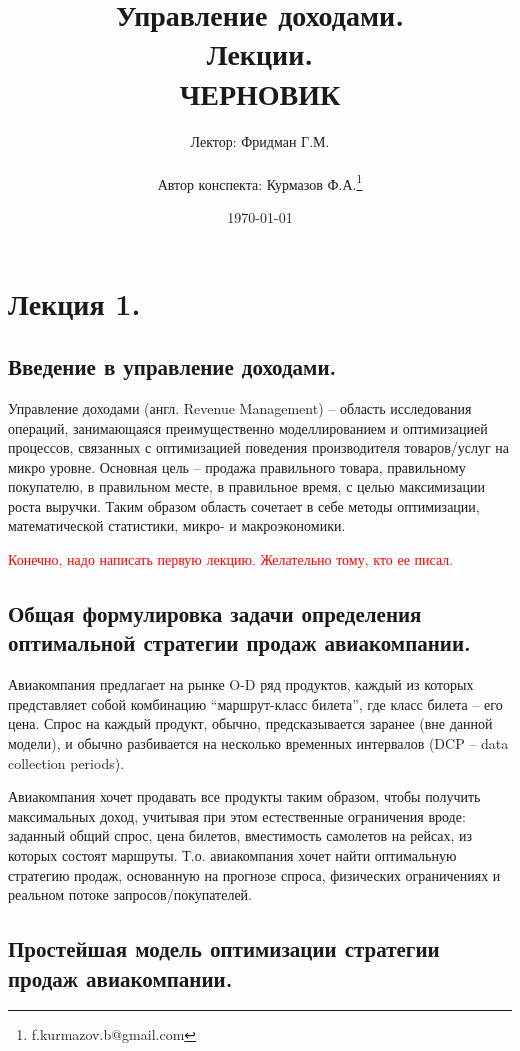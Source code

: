 \documentclass[reqno]{article}
\title{Управление доходами.\\ Лекции.\\ ЧЕРНОВИК}
\author{Лектор: Фридман Г.М.\\  \\ Автор конспекта: Курмазов Ф.А.\thanks{f.kurmazov.b@gmail.com}}
\date{\today}
\theoremstyle{definition}
\theoremstyle{definition}
\theoremstyle{definition}
\theoremstyle{definition}
\theoremstyle{definition}
\theoremstyle{definition}
\theoremstyle{definition}
\theoremstyle{definition}
\theoremstyle{definition}
\begin{document}
	\setlength{\parindent}{0pt}

	\maketitle

	\tableofcontents


	\newpage
	\section{Лекция 1.}
		\subsection{Введение в управление доходами.}
			
		Управление доходами (англ. Revenue Management) -- область исследования операций, занимающаяся преимущественно моделлированием и оптимизацией процессов, связанных с оптимизацией поведения производителя товаров/услуг на микро уровне. Основная цель -- продажа правильного товара, правильному покупателю, в правильном месте, в правильное время, с целью максимизации роста выручки. Таким образом область сочетает в себе методы оптимизации, математической статистики, микро- и макроэкономики.
		
		\textcolor{red}{Конечно, надо написать первую лекцию. Желательно тому, кто ее писал.}
		
		\subsection{Общая формулировка задачи определения оптимальной стратегии продаж авиакомпании.}
			Авиакомпания предлагает на рынке O-D ряд продуктов, каждый из которых представляет собой комбинацию ``маршрут-класс билета'', где класс билета -- его цена. Спрос на каждый продукт, обычно, предсказывается заранее (вне данной модели), и обычно разбивается на несколько временных интервалов (DCP -- data collection periods).
			
			Авиакомпания хочет продавать все продукты таким образом, чтобы получить максимальных доход, учитывая при этом естественные ограничения вроде: заданный общий спрос, цена билетов, вместимость самолетов на рейсах, из которых состоят маршруты. Т.о. авиакомпания хочет найти оптимальную стратегию продаж, основанную на прогнозе спроса, физических ограничениях и реальном потоке запросов/покупателей.
		
		\subsection{Простейшая модель оптимизации стратегии продаж авиакомпании.}
	
\end{document}
